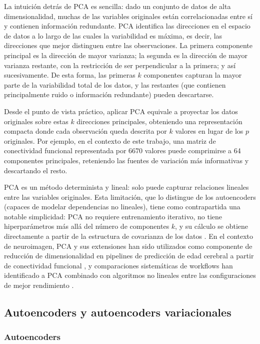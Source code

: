 La intuición detrás de PCA es sencilla: dado un conjunto de datos de alta dimensionalidad, muchas de las variables originales están correlacionadas entre sí y contienen información redundante. PCA identifica las direcciones en el espacio de datos a lo largo de las cuales la variabilidad es máxima, es decir, las direcciones que mejor distinguen entre las observaciones. La primera componente principal es la dirección de mayor varianza; la segunda es la dirección de mayor varianza restante, con la restricción de ser perpendicular a la primera; y así sucesivamente. De esta forma, las primeras $k$ componentes capturan la mayor parte de la variabilidad total de los datos, y las restantes (que contienen principalmente ruido o información redundante) pueden descartarse.

Desde el punto de vista práctico, aplicar PCA equivale a proyectar los datos originales sobre estas $k$ direcciones principales, obteniendo una representación compacta donde cada observación queda descrita por $k$ valores en lugar de los $p$ originales. Por ejemplo, en el contexto de este trabajo, una matriz de conectividad funcional representada por 6670 valores puede comprimirse a 64 componentes principales, reteniendo las fuentes de variación más informativas y descartando el resto.

PCA es un método determinista y lineal: solo puede capturar relaciones lineales entre las variables originales. Esta limitación, que lo distingue de los autoencoders (capaces de modelar dependencias no lineales), tiene como contrapartida una notable simplicidad: PCA no requiere entrenamiento iterativo, no tiene hiperparámetros más allá del número de componentes $k$, y su cálculo se obtiene directamente a partir de la estructura de covarianza de los datos \cite{jolliffe2002pca}. En el contexto de neuroimagen, PCA y sus extensiones han sido utilizados como componente de reducción de dimensionalidad en pipelines de predicción de edad cerebral a partir de conectividad funcional \cite{monti2020interpretable}, y comparaciones sistemáticas de workflows han identificado a PCA combinado con algoritmos no lineales entre las configuraciones de mejor rendimiento \cite{more2023brain}.

\subsection{Autoencoders y autoencoders variacionales}

\subsubsection{Autoencoders}

